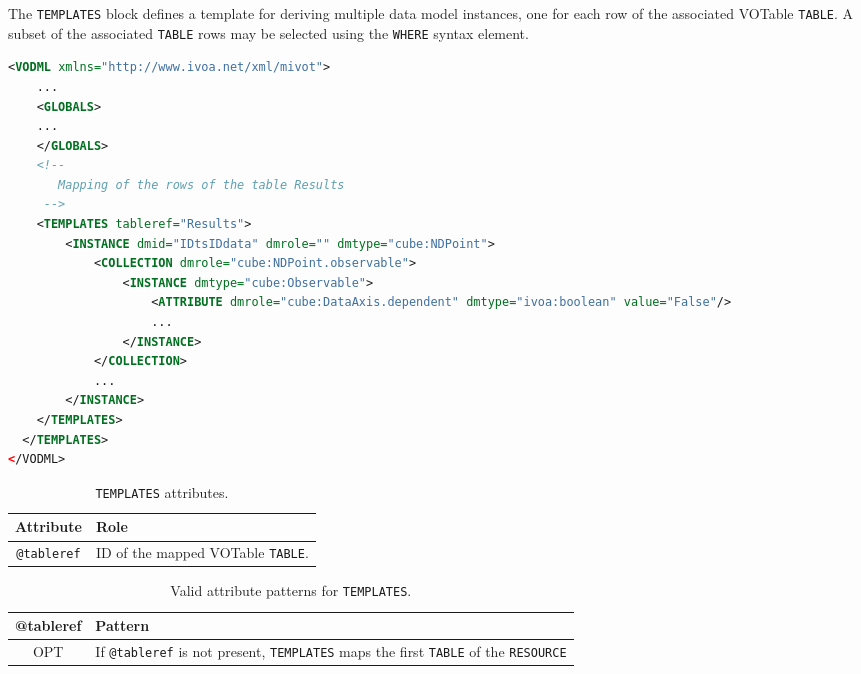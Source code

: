 The \texttt{TEMPLATES} block defines a template for deriving multiple data model instances,
one for each row of the associated VOTable \texttt{TABLE}.  A subset of the associated
\texttt{TABLE} rows may be selected using the \texttt{WHERE} syntax element.

\begin{lstlisting}[caption={Example of a \texttt{TEMPLATES} block mapping the rows of the table \texttt{Results} (see in \ref{TEMPLATES_snippet}).},language=XML]
<VODML xmlns="http://www.ivoa.net/xml/mivot">
    ...
    <GLOBALS>
    ...
    </GLOBALS>
    <!--
       Mapping of the rows of the table Results
     -->  
    <TEMPLATES tableref="Results">
        <INSTANCE dmid="IDtsIDdata" dmrole="" dmtype="cube:NDPoint">
            <COLLECTION dmrole="cube:NDPoint.observable">
                <INSTANCE dmtype="cube:Observable">
                    <ATTRIBUTE dmrole="cube:DataAxis.dependent" dmtype="ivoa:boolean" value="False"/>
                    ...
                </INSTANCE>
            </COLLECTION>
            ...
        </INSTANCE>
    </TEMPLATES>
  </TEMPLATES>
</VODML>
\end{lstlisting}

\begin{table}[!htbp]
  \small
  \centering
  \begin{tabulary}{\linewidth}{|c|J|}
    \hline 
         \textbf{Attribute} & 
         \textbf {Role}\\
    \hline
    \hline  
         \texttt{@tableref} & 
         ID of the mapped VOTable \texttt{TABLE}.\\
    \hline 
  \end{tabulary}
  \caption{\texttt{TEMPLATES} attributes.} 
  \label{tbl:templates-att}
\end{table}

\begin{table}[!htbp]
  \small
  \centering
  \begin{tabulary}{\linewidth}{|c|J|}
    \hline 
        \textbf{@tableref} &
        \textbf{Pattern}\\
    \hline
    \hline  
        OPT &           
        If \texttt{@tableref} is not present, \texttt{TEMPLATES} maps the first \texttt{TABLE} of the \texttt{RESOURCE}\\
    \hline 
  \end{tabulary}
  \caption{Valid attribute patterns for  \texttt{TEMPLATES}.} 
  \label{tbl:templates-pattern}
 \end{table}

